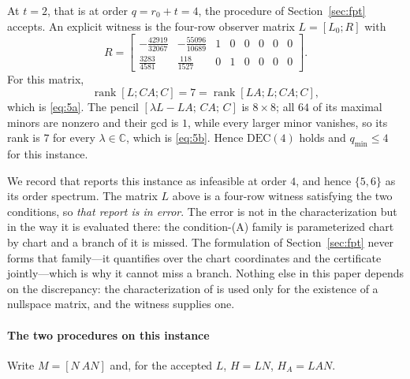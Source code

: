 \documentclass[journal]{IEEEtran}
\theoremstyle{plainn}
\theoremstyle{remark}
\begin{document}
At $t=2$, that is at order $q=r_0+t=4$, the procedure of Section~\ref{sec:fpt} accepts. An explicit
witness is the four-row observer matrix $L=[L_0;R]$ with
\begin{equation*}
R=\begin{bmatrix}
-\tfrac{42919}{32067} & -\tfrac{55096}{10689} & 1 & 0 & 0 & 0 & 0 & 0\\
\tfrac{3283}{4581} & \tfrac{118}{1527} & 0 & 1 & 0 & 0 & 0 & 0
\end{bmatrix}.
\end{equation*}
For this matrix,
\begin{equation*}
\operatorname{rank}[L;CA;C]=7=\operatorname{rank}[LA;L;CA;C],
\end{equation*}
which is \eqref{eq:5a}. The pencil $[\lambda L-LA;\,CA;\,C]$ is $8\times8$; all $64$ of its maximal
minors are nonzero and their gcd is $1$, while every larger minor vanishes, so its rank is $7$ for
every $\lambda\in\mathbb C$, which is \eqref{eq:5b}. Hence $\mathrm{DEC}(4)$ holds and
$q_{\min}\le4$ for this instance.

We record that \cite[Sec.~VII-B]{fer26b} reports this instance as infeasible at order $4$, and
hence $\{5,6\}$ as its order spectrum. The matrix $L$ above is a four-row witness satisfying the
two conditions, so \emph{that report is in error}. The error is not in the characterization but in
the way it is evaluated there: the condition-(A) family is parameterized chart by chart and a
branch of it is missed. The formulation of Section~\ref{sec:fpt} never forms that family---it
quantifies over the chart coordinates and the certificate jointly---which is why it cannot miss a
branch. Nothing else in this paper depends on the discrepancy: the characterization of
\cite{fer26b} is used only for the existence of a nullspace matrix, and the witness supplies one.

\paragraph*{The two procedures on this instance}
Write $M=[N\ AN]$ and, for the accepted $L$, $H=LN$, $H_A=LAN$.
\end{document}

